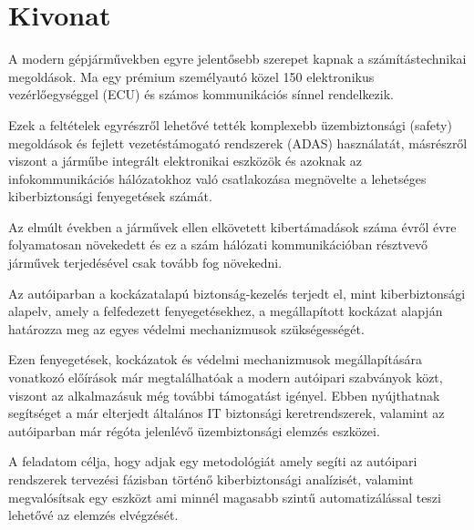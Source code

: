 \setcounter{page}{1}

\selecthungarian

\chapter*{Kivonat}

A modern gépjárművekben egyre jelentősebb szerepet kapnak a számítástechnikai megoldások. Ma egy prémium személyautó közel 150 elektronikus vezérlőegységgel (ECU) és számos kommunikációs sínnel rendelkezik. 

Ezek a feltételek egyrészről lehetővé tették komplexebb üzembiztonsági (safety) megoldások és fejlett vezetéstámogató rendszerek (ADAS) használatát, másrészről viszont a járműbe integrált elektronikai eszközök és azoknak az infokommunikációs hálózatokhoz való csatlakozása megnövelte a lehetséges kiberbiztonsági fenyegetések számát.

Az elmúlt években a járművek ellen elkövetett kibertámadások száma évről évre folyamatosan növekedett és ez a szám hálózati kommunikációban résztvevő járművek terjedésével csak tovább fog növekedni.

Az autóiparban a kockázatalapú biztonság-kezelés terjedt el, mint kiberbiztonsági alapelv, amely a felfedezett fenyegetésekhez, a megállapított kockázat alapján határozza meg az egyes védelmi mechanizmusok szükségességét.

Ezen fenyegetések, kockázatok és védelmi mechanizmusok megállapítására vonatkozó előírások már megtalálhatóak a modern autóipari szabványok közt, viszont az alkalmazásuk még további támogatást igényel. Ebben nyújthatnak segítséget a már elterjedt általános IT biztonsági keretrendszerek, valamint az autóiparban már régóta jelenlévő üzembiztonsági elemzés eszközei.

A feladatom célja, hogy adjak egy metodológiát amely segíti az autóipari rendszerek tervezési fázisban történő kiberbiztonsági analízisét, valamint megvalósítsak egy eszközt ami minnél magasabb szintű automatizálással teszi lehetővé az elemzés elvégzését. 

\vfill
\selectenglish


